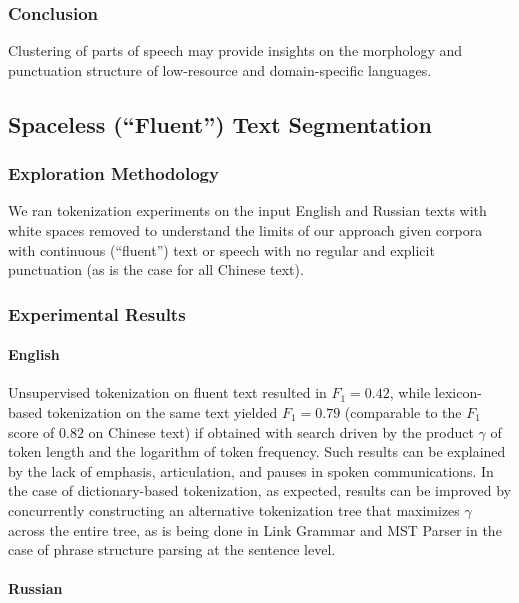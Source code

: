 \documentclass[11pt]{article}
\begin{document}
\subsubsection{Conclusion}

Clustering of parts of speech may provide insights on the morphology and punctuation structure of low-resource and domain-specific languages.

\subsection{Spaceless (“Fluent”) Text Segmentation}

\subsubsection{Exploration Methodology}

We ran tokenization experiments on the input English and Russian texts with white spaces removed to understand the limits of our approach given corpora with continuous (“fluent”) text or speech with no regular and explicit punctuation (as is the case for all Chinese text).

\subsubsection{Experimental Results}

\paragraph{English}

Unsupervised tokenization on fluent text resulted in $F_1=0.42$, while lexicon-based tokenization on the same text yielded $F_1=0.79$ (comparable to the $F_1$ score of $0.82$ on Chinese text) if obtained with search driven by the product $\gamma$ of token length and the logarithm of token frequency. Such results can be explained by the lack of emphasis, articulation, and pauses in spoken communications. In the case of dictionary-based tokenization, as expected, results can be improved by concurrently constructing an alternative tokenization tree that maximizes $\gamma$ across the entire tree, as is being done in Link Grammar and MST Parser \citep[see][]{3, 5, 6} in the case of phrase structure parsing at the sentence level.

\paragraph{Russian}
\end{document}
